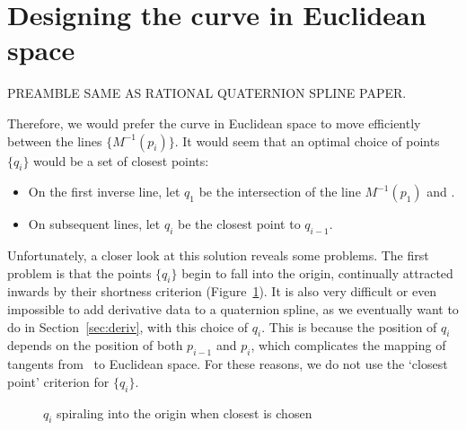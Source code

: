 \section{Designing the curve in Euclidean space} 

PREAMBLE SAME AS RATIONAL QUATERNION SPLINE PAPER.

Therefore, we would prefer the curve in Euclidean space to move
efficiently between the lines $\{M^{-1}(p_i)\}$.
It would seem that an optimal choice of points	
$\{q_i\}$ would be a set of closest points:
	
\begin{itemize}
\item On the first inverse line, let $q_1$ be the intersection
of the line $M^{-1}(p_1)$ and .
\item On subsequent lines, let $q_i$ be the closest point to $q_{i-1}$.
\end{itemize}

Unfortunately, a closer look at this solution reveals some problems.
The first problem is that the points $\{q_i\}$ begin to fall
into the origin, continually attracted inwards by their 
shortness criterion (Figure~\ref{fig:spiral}).
%
It is also very difficult or even impossible to add derivative data to 
a quaternion spline, as we eventually want to do in Section~\ref{sec:deriv},
with this choice of $q_i$.
This is because the position of $q_i$ depends on the position
of both $p_{i-1}$ and $p_i$, which complicates the mapping of tangents
from \ to Euclidean space.
For these reasons, we do not use the `closest point' criterion for $\{q_i\}$.

\begin{figure}
\vspace{2in}
\caption{$q_i$ spiraling into the origin when closest is chosen}
\label{fig:spiral}
\end{figure}

